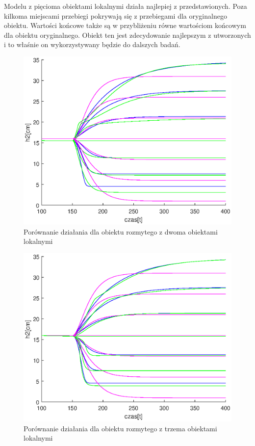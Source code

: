 		Modelu z pięcioma obiektami lokalnymi działa najlepiej z przedstawionych. Poza kilkoma miejscami przebiegi pokrywają się z przebiegami dla oryginalnego obiektu. Wartości końcowe także są w przybliżeniu równe wartościom końcowym dla obiektu oryginalnego. Obiekt ten jest zdecydowanie najlepszym z utworzonych i to właśnie on wykorzystywany będzie do dalszych badań.
		
		\begin{figure}[h!]
			\includegraphics[width=0.9\linewidth]{plots/z2_modelroz_2p.eps}
			\caption{Porównanie działania dla obiektu rozmytego z dwoma obiektami lokalnymi}
			\label{rys:roz2p}
		\end{figure}
		\begin{figure}[h!]
			\includegraphics[width=0.9\linewidth]{plots/z2_modelroz_3p.eps}
			\caption{Porównanie działania dla obiektu rozmytego z trzema obiektami lokalnymi}
			\label{rys:roz3p}
		\end{figure}
